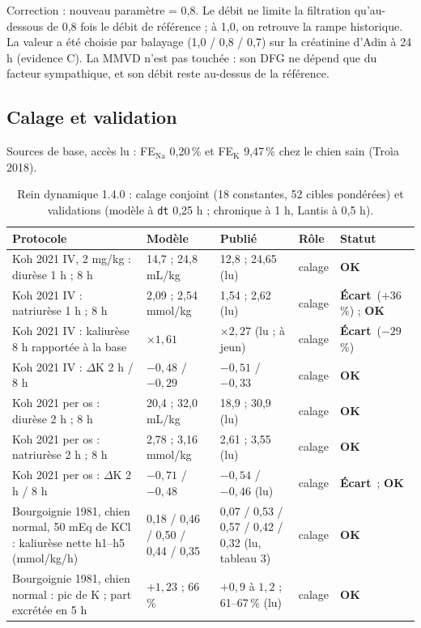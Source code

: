\documentclass[10pt,a4paper]{article}
\newcommand{\ok}{\textcolor{green!45!black}{\textbf{OK}}}
\newcommand{\ecart}{\textcolor{red!70!black}{\textbf{Écart}}}
\newcommand{\vp}[1]{\path{#1}}
\begin{document}
Correction : nouveau paramètre \vp{renal_co_auto} = 0,8. Le débit ne limite la filtration qu'au-dessous de 0,8 fois le débit de référence ; à 1,0, on retrouve la rampe historique. La valeur a été choisie par balayage (1,0 / 0,8 / 0,7) sur la créatinine d'Adin à 24 h (evidence C). La MMVD n'est pas touchée : son DFG ne dépend que du facteur sympathique, et son débit reste au-dessus de la référence.

\subsection{Calage et validation}
Sources de base, accès lu : FE$_\mathrm{Na}$ 0,20\,\% et FE$_\mathrm{K}$ 9,47\,\% chez le chien sain (Troìa 2018).

\begin{table}[h]\small
\caption{Rein dynamique 1.4.0 : calage conjoint (18 constantes, 52 cibles pondérées) et validations (modèle à \texttt{dt} 0,25 h ; chronique à 1 h, Lantis à 0,5 h).}
\begin{tabularx}{\linewidth}{P{4.6cm}P{2.4cm}P{3.3cm}LP{1.3cm}}
\toprule
Protocole & Modèle & Publié & Rôle & Statut\\
\midrule
Koh 2021 IV, 2 mg/kg : diurèse 1 h ; 8 h & 14,7 ; 24,8 mL/kg & 12,8 ; 24,65 (lu) & calage & \ok\\
Koh 2021 IV : natriurèse 1 h ; 8 h & 2,09 ; 2,54 mmol/kg & 1,54 ; 2,62 (lu) & calage & \ecart\ ($+36$\,\%) ; \ok\\
Koh 2021 IV : kaliurèse 8 h rapportée à la base & $\times 1{,}61$ & $\times 2{,}27$ (lu ; à jeun) & calage & \ecart\ ($-29$\,\%)\\
Koh 2021 IV : $\Delta$K 2 h / 8 h & $-0{,}48$ / $-0{,}29$ & $-0{,}51$ / $-0{,}33$ & calage & \ok\\
Koh 2021 per os : diurèse 2 h ; 8 h & 20,4 ; 32,0 mL/kg & 18,9 ; 30,9 (lu) & calage & \ok\\
Koh 2021 per os : natriurèse 2 h ; 8 h & 2,78 ; 3,16 mmol/kg & 2,61 ; 3,55 (lu) & calage & \ok\\
Koh 2021 per os : $\Delta$K 2 h / 8 h & $-0{,}71$ / $-0{,}48$ & $-0{,}54$ / $-0{,}46$ (lu) & calage & \ecart\ ; \ok\\
Bourgoignie 1981, chien normal, 50 mEq de KCl : kaliurèse nette h1–h5 (mmol/kg/h) & 0,18 / 0,46 / 0,50 / 0,44 / 0,35 & 0,07 / 0,53 / 0,57 / 0,42 / 0,32 (lu, tableau 3) & calage & \ok\\
Bourgoignie 1981, chien normal : pic de K ; part excrétée en 5 h & $+1{,}23$ ; 66\,\% & $+0{,}9$ à $1{,}2$ ; 61–67\,\% (lu) & calage & \ok\\

\end{tabularx}
\end{table}
\end{document}
